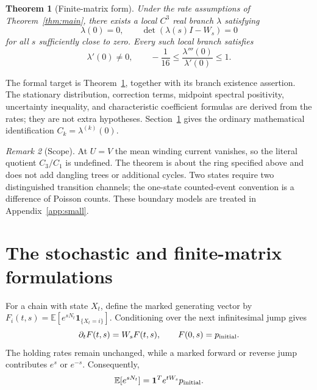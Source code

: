 \documentclass[11pt,a4paper]{article}
\numberwithin{equation}{section}
\newtheorem{theorem}{Theorem}[section]
\theoremstyle{remark}
\newtheorem{remark}[theorem]{Remark}
\newcommand{\E}{\mathbb E}
\newcommand{\Id}{I}
\begin{document}
\begin{theorem}[Finite-matrix form]\label{thm:matrix}
Under the rate assumptions of Theorem~\ref{thm:main}, there exists a local
$C^3$ real branch $\lambda$ satisfying
\[
  \lambda(0)=0,\qquad \det(\lambda(s)\Id-W_s)=0
\]
for all $s$ sufficiently close to zero. Every such local branch satisfies
\[
  \lambda'(0)\ne0,\qquad
  -\frac1{16}\le\frac{\lambda'''(0)}{\lambda'(0)}\le1.
\]
\end{theorem}

The formal target is Theorem~\ref{thm:matrix}, together with its branch
existence assertion. The stationary distribution, correction terms,
midpoint spectral positivity, uncertainty inequality, and characteristic
coefficient formulas are derived from the rates; they are not extra
hypotheses. Section~\ref{sec:stochastic} gives the ordinary mathematical
identification $C_k=\lambda^{(k)}(0)$.

\begin{remark}[Scope]
At $U=V$ the mean winding current vanishes, so the literal quotient
$C_3/C_1$ is undefined. The theorem is about the ring specified above and
does not add dangling trees or additional cycles. Two states require two
distinguished transition channels; the one-state counted-event convention
is a difference of Poisson counts. These boundary models are treated in
Appendix~\ref{app:small}.
\end{remark}

\section{The stochastic and finite-matrix formulations}\label{sec:stochastic}

For a chain with state $X_t$, define the marked generating vector by
$F_i(t,s)=\E[e^{sN_t}\mathbf1_{\{X_t=i\}}]$. Conditioning over the next
infinitesimal jump gives
\[
  \partial_tF(t,s)=W_sF(t,s),\qquad F(0,s)=p_{\rm initial}.
\]
The holding rates remain unchanged, while a marked forward or reverse jump
contributes $e^s$ or $e^{-s}$. Consequently,
\begin{equation}\label{eq:mgf}
  \E[e^{sN_t}]=\mathbf1^T e^{tW_s}p_{\rm initial}.
\end{equation}
\end{document}

